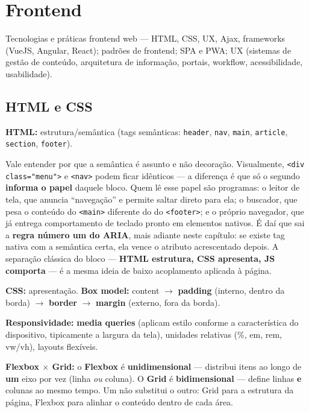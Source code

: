\chapter{Frontend}
\label{cap:frontend}

\begin{edital}
Tecnologias e práticas frontend web --- HTML, CSS, UX, Ajax, frameworks
(VueJS, Angular, React); padrões de frontend; SPA e PWA; UX (sistemas de
gestão de conteúdo, arquitetura de informação, portais, workflow,
acessibilidade, usabilidade).
\end{edital}

\section{HTML e CSS}

\textbf{HTML:} estrutura/semântica (tags semânticas: \texttt{header},
\texttt{nav}, \texttt{main}, \texttt{article}, \texttt{section},
\texttt{footer}).

Vale entender por que a semântica é assunto e não decoração. Visualmente,
\texttt{<div class="menu">} e \texttt{<nav>} podem ficar idênticos --- a
diferença é que só o segundo \textbf{informa o papel} daquele bloco. Quem lê
esse papel são programas: o leitor de tela, que anuncia ``navegação'' e permite
saltar direto para ela; o buscador, que pesa o conteúdo do \texttt{<main>}
diferente do do \texttt{<footer>}; e o próprio navegador, que já entrega
comportamento de teclado pronto em elementos nativos. É daí que sai a
\textbf{regra número um do ARIA}, mais adiante neste capítulo: se existe tag
nativa com a semântica certa, ela vence o atributo acrescentado depois. A
separação clássica do bloco --- \textbf{HTML estrutura, CSS apresenta, JS
comporta} --- é a mesma ideia de baixo acoplamento aplicada à página.

\textbf{CSS:} apresentação. \textbf{Box model:} content $\to$
\textbf{padding} (interno, dentro da borda) $\to$ \textbf{border} $\to$
\textbf{margin} (externo, fora da borda).

\textbf{Responsividade:} \textbf{media queries} (aplicam estilo conforme a
característica do dispositivo, tipicamente a largura da tela), unidades
relativas (\%, em, rem, vw/vh), layouts flexíveis.

\textbf{Flexbox $\times$ Grid:} o \textbf{Flexbox} é
\textbf{unidimensional} --- distribui itens ao longo de \textbf{um} eixo por
vez (linha \emph{ou} coluna). O \textbf{Grid} é \textbf{bidimensional} ---
define linhas \textbf{e} colunas ao mesmo tempo. Um não substitui o outro:
Grid para a estrutura da página, Flexbox para alinhar o conteúdo dentro de
cada área.

